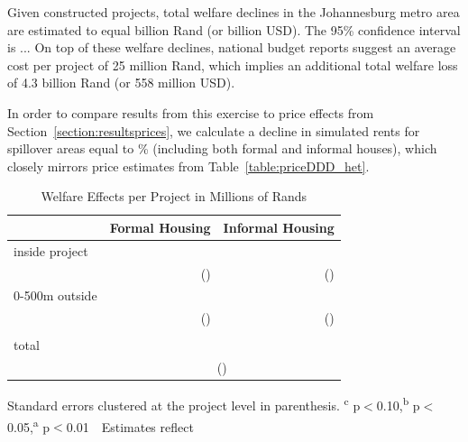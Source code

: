 \documentclass[12pt]{article}
\begin{document}
Given constructed projects, total welfare declines in the Johannesburg metro area are estimated to equal billion Rand (or billion USD).  The 95\% confidence interval is ... On top of these welfare declines, national budget reports suggest an average cost per project of 25 million Rand, which implies an additional total welfare loss of 4.3 billion Rand (or 558 million USD).  

In order to compare results from this exercise to price effects from Section~\ref{section:resultsprices}, we calculate a decline in simulated rents for spillover areas equal to \unskip\% (including both formal and informal houses), which closely mirrors price estimates from Table~\ref{table:priceDDD_het}.



\begin{table}[h]
\centering
\caption{Welfare Effects per Project in Millions of Rands}\label{table:housingdemandestimates}
\vspace{-2mm}
\begin{threeparttable}
\begin{tabular}{lDD}
\toprule
   &   Formal Housing &  Informal Housing  \\ \midrule 
inside project &  &  \\
& () & () \\
0-500m outside & &  \\
& () & () \\
\\
total &  \\
                         &  \\
\bottomrule
\end{tabular}
\begin{tablenotes}
\item \footnotesize Standard errors clustered at the project level in parenthesis. \textsuperscript{c} p$<$0.10,\textsuperscript{b} p$<$0.05,\textsuperscript{a} p$<$0.01 \,\,  Estimates reflect 
\end{tablenotes}
\end{threeparttable}
\end{table}
\end{document}
